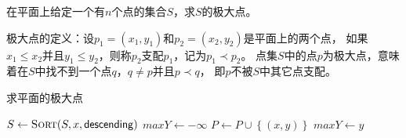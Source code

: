 \begin{questions}
    \question 在平面上给定一个有$n$个点的集合$S$，求$S$的极大点。

    极大点的定义：设$p_1=(x_1,y_1)$和$p_2=(x_2,y_2)$是平面上的两个点，
    如果$x_1 \le x_2$并且$y_1 \le y_2$，则称$p_2$支配$p_1$，记为$p_1 \prec p_2$。
    点集$S$中的点$p$为极大点，意味着在$S$中找不到一个点$q$，$q \ne p$并且$p \prec q$，
    即$p$不被$S$中其它点支配。

    \begin{solution}

        \begin{algorithm}[H]
            \caption{求平面的极大点}
            \begin{algorithmic}[1]
                \State $S \gets \Call{Sort}{S, x, \mathsf{descending}}$ 
                \State $maxY \gets - \infty$
                 
                 
                \State $P \gets P \cup \left\{ (x,y) \right\}$
                \State $maxY \gets y$
                \Else
                \Statex {}
                \EndIf
                \EndFor
            \end{algorithmic}
        \end{algorithm}

    \end{solution}

\end{questions}
